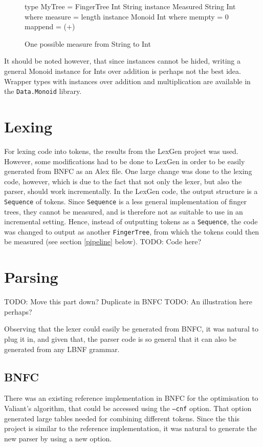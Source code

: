 \documentclass[a4paper,12pt,twosided]{report}
\begin{document}
\begin{figure}[H]
\begin{code}
type MyTree = FingerTree Int String
instance Measured String Int where
    measure = length
instance Monoid Int where
    mempty = 0
    mappend = (+)
\end{code}
\caption{One possible measure from String to Int}
\end{figure}
It should be noted however, that since instances cannot be hided, writing a
general Monoid instance for Ints over addition is perhaps not the best idea.
Wrapper types with instances over addition and multiplication are available in
the \texttt{Data.Monoid} library.

\section{Lexing}
For lexing code into tokens, the results from the LexGen project was used.
However, some modifications had to be done to LexGen in order to be easily
generated from BNFC as an Alex file. One large change was done to the lexing
code, however, which is due to the fact that not only the lexer, but also the
parser, should work incrementally. In the LexGen code, the output structure is a
\texttt{Sequence} of tokens. Since \texttt{Sequence} is a less general
implementation of finger trees, they cannot be measured, and is therefore not as
suitable to use in an incremental setting. Hence, instead of outputting tokens
as a \texttt{Sequence}, the code was changed to output as another
\texttt{FingerTree}, from which the tokens could then be measured (see section
\ref{pipeline} below).
TODO: Code here?

\section{Parsing}
TODO: Move this part down? Duplicate in BNFC
TODO: An illustration here perhaps?

Observing that the lexer could easily be generated from BNFC, it was natural to
plug it in, and given that, the parser code is so general that it can also be
generated from any LBNF grammar.
\subsection{BNFC}
There was an existing reference implementation in BNFC for the optimisation to
Valiant's algorithm, that could be accessed using the \texttt{--cnf} option.
That option generated large tables needed for combining different tokens. Since
the this project is similar to the reference implementation, it was natural to
generate the new parser by using a new option.
\end{document}
